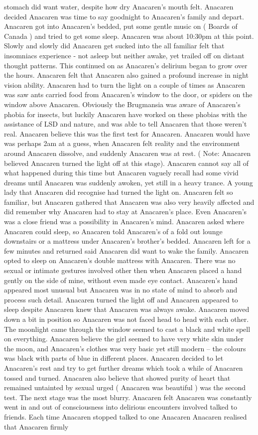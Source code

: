 \documentclass[12pt]{book}
\begin{document}
stomach did want water, despite how dry Anacaren's mouth felt. Anacaren decided Anacaren was time to say goodnight to Anacaren's family and depart. Anacaren got into Anacaren's bedded, put some gentle music on ( Boards of Canada ) and tried to get some sleep. Anacaren was about 10:30pm at this point. Slowly and slowly did Anacaren get sucked into the all familiar felt that insomniacs experience - not asleep but neither awake, yet trailed off on distant thought patterns. This continued on as Anacaren's delirium began to grow over the hours. Anacaren felt that Anacaren also gained a profound increase in night vision ability. Anacaren had to turn the light on a couple of times as Anacaren was saw ants carried food from Anacaren's window to the door, or spiders on the window above Anacaren. Obviously the Brugmansia was aware of Anacaren's phobia for insects, but luckily Anacaren have worked on these phobias with the assistance of LSD and nature, and was able to tell Anacaren that those weren't real. Anacaren believe this was the first test for Anacaren. Anacaren would have was perhaps 2am at a guess, when Anacaren felt reality and the environment around Anacaren dissolve, and suddenly Anacaren was at rest. ( Note: Anacaren believed Anacaren turned the light off at this stage). Anacaren cannot say all of what happened during this time but Anacaren vaguely recall had some vivid dreams until Anacaren was suddenly awoken, yet still in a heavy trance. A young lady that Anacaren did recognise had turned the light on. Anacaren felt so familiar, but Anacaren gathered that Anacaren was also very heavily affected and did remember why Anacaren had to stay at Anacaren's place. Even Anacaren's was a close friend was a possibility in Anacaren's mind. Anacaren asked where Anacaren could sleep, so Anacaren told Anacaren's of a fold out lounge downstairs or a mattress under Anacaren's brother's bedded. Anacaren left for a few minutes and returned said Anacaren did want to wake the family. Anacaren opted to sleep on Anacaren's double mattress with Anacaren. There was no sexual or intimate gestures involved other then when Anacaren placed a hand gently on the side of mine, without even made eye contact. Anacaren's hand appeared most unusual but Anacaren was in no state of mind to absorb and process such detail. Anacaren turned the light off and Anacaren appeared to sleep despite Anacaren knew that Anacaren was always awake. Anacaren moved down a bit in position so Anacaren was not faced head to head with each other. The moonlight came through the window seemed to cast a black and white spell on everything. Anacaren believe the girl seemed to have very white skin under the moon, and Anacaren's clothes was very basic yet still modern -- the colours was black with parts of blue in different places. Anacaren decided to let Anacaren's rest and try to get further dreams which took a while of Anacaren tossed and turned. Anacaren also believe that showed purity of heart that remained untainted by sexual urged ( Anacaren was beautiful ) was the second test. The next stage was the most blurry. Anacaren felt Anacaren was constantly went in and out of consciousness into delirious encounters involved talked to friends. Each time Anacaren stopped talked to one Anacaren Anacaren realised that Anacaren firmly 
\end{document}
